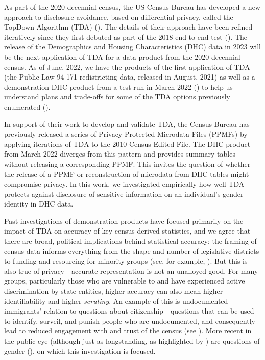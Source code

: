 \documentclass{jpc} %
\theoremstyle{plain}\newtheorem{satz}[thm]{Satz} %
\begin{document}
As part of the 2020 decennial census, the US Census Bureau has developed a new approach to disclosure avoidance, based on differential privacy, called the TopDown Algorithm (TDA) (\cite{abowd2019census}).  The details of their approach have been refined iteratively since they first debuted as part of the 2018 end-to-end test (\cite{garfinkel2019end}).  The release of the Demographics and Housing Characteristics (DHC) data in 2023 will be the next application of TDA for a data product from the 2020 decennial census. As of June, 2022, we have the products of the first application of TDA (the Public Law 94-171 redistricting data, released in August, 2021) as well as a demonstration DHC product from a test run in March 2022 (\cite{census2022demonstration}) to help us understand plans and trade-offs for some of the TDA options previously enumerated  (\cite{petti2019differential}).

In support of their work to develop and validate TDA,  the Census Bureau has previously released a series of Privacy-Protected Microdata Files (PPMFs) by applying iterations of TDA to the 2010 Census Edited File.  The DHC product from March 2022 diverges from this pattern and provides summary tables without releasing a corresponding PPMF.  This invites the question of whether the release of a PPMF or reconstruction of microdata from DHC tables might compromise privacy.  In this work, we investigated empirically how well TDA protects against disclosure of sensitive information on an individual's gender identity in DHC data.

Past investigations of demonstration products have focused primarily on the impact of TDA on accuracy of key census-derived statistics,
and we agree that there are broad, political implications behind statistical accuracy; the framing of census data informs everything from the shape and number of legislative districts to funding and resourcing for minority groups (see, for example, \cite{thompson2012making}). But this is also true of privacy---accurate representation is not an unalloyed good. For many groups, particularly those who are vulnerable to and have experienced active discrimination by state entities, higher accuracy can also mean higher identifiability and higher \textit{scrutiny}. An example of this is undocumented immigrants' relation to questions about citizenship---questions that can be used to identify, surveil, and punish people who are undocumented, and consequently lead to reduced engagement with and trust of the census (see \cite{barreto2019}). More recent in the public eye (although just as longstanding, as highlighted by \cite{canaday2009straight}) are questions of gender (\cite{singer2015profusion}), on which this investigation is focused.
\end{document}
